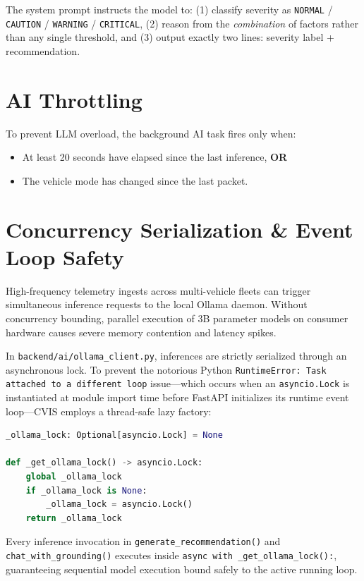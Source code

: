 \documentclass[12pt,a4paper]{report}
\begin{document}
The system prompt instructs the model to: (1) classify severity as \texttt{NORMAL} / \texttt{CAUTION} / \texttt{WARNING} / \texttt{CRITICAL}, (2) reason from the \textit{combination} of factors rather than any single threshold, and (3) output exactly two lines: severity label + recommendation.

\section{AI Throttling}

To prevent LLM overload, the background AI task fires only when:
\begin{itemize}
  \item At least 20 seconds have elapsed since the last inference, \textbf{OR}
  \item The vehicle mode has changed since the last packet.
\end{itemize}

\section{Concurrency Serialization \& Event Loop Safety}

High-frequency telemetry ingests across multi-vehicle fleets can trigger simultaneous inference requests to the local Ollama daemon. Without concurrency bounding, parallel execution of 3B parameter models on consumer hardware causes severe memory contention and latency spikes.

In \texttt{backend/ai/ollama\_client.py}, inferences are strictly serialized through an asynchronous lock. To prevent the notorious Python \texttt{RuntimeError: Task attached to a different loop} issue—which occurs when an \texttt{asyncio.Lock} is instantiated at module import time before FastAPI initializes its runtime event loop—CVIS employs a thread-safe lazy factory:

\begin{lstlisting}[language=Python, caption=Lazy Event-Loop Lock Factory (backend/ai/ollama\_client.py)]
_ollama_lock: Optional[asyncio.Lock] = None

def _get_ollama_lock() -> asyncio.Lock:
    global _ollama_lock
    if _ollama_lock is None:
        _ollama_lock = asyncio.Lock()
    return _ollama_lock
\end{lstlisting}

Every inference invocation in \nolinkurl{generate_recommendation()} and \nolinkurl{chat_with_grounding()} executes inside \texttt{async with \_get\_ollama\_lock():}, guaranteeing sequential model execution bound safely to the active running loop.
\end{document}

